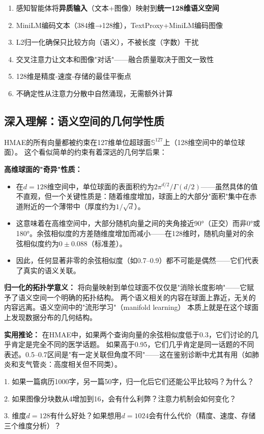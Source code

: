 \documentclass[11pt,a4paper]{ctexart}
\begin{document}
\begin{enumerate}[nosep]
\item 感知智能体将\textbf{异质输入}（文本+图像）映射到\textbf{统一128维语义空间}
\item MiniLM编码文本（384维→128维），TextProxy+MiniLM编码图像
\item L2归一化确保只比较方向（语义），不被长度（字数）干扰
\item 交叉注意力让文本和图像"对话"——融合质量取决于图文一致性
\item 128维是精度-速度-存储的最佳平衡点
\item 不确定性从注意力分散中自然涌现，无需额外计算
\end{enumerate}



\subsection{深入理解：语义空间的几何学性质}

HMAE的所有向量都被约束在127维单位超球面$\mathbb{S}^{127}$上（128维空间中的单位球面）。
这个看似简单的约束有着深远的几何学后果：

\textbf{高维球面的"奇异"性质：}
\begin{itemize}[nosep]
\item 在$d=128$维空间中，单位球面的表面积约为$2\pi^{d/2}/\Gamma(d/2)$——虽然具体的值不直观，但一个关键性质是：随着维度增加，球面上的大部分"面积"集中在赤道附近的一个薄带中（厚度约为$1/\sqrt{d}$）。
\item 这意味着在高维空间中，大部分随机向量之间的夹角接近90°（正交）而非0°或180°。余弦相似度的方差随维度增加而减小——在128维时，随机向量对的余弦相似度约为$0 \pm 0.088$（标准差）。
\item 因此，任何显著非零的余弦相似度（如0.7--0.9）都不可能是偶然——它们代表了真实的语义关联。
\end{itemize}

\textbf{归一化的拓扑学意义：}
将向量映射到单位球面不仅仅是"消除长度影响"——它赋予了语义空间一个明确的拓扑结构。
两个语义相关的内容在球面上靠近，无关的内容远离。语义空间中的"流形学习"（manifold learning）
本质上就是在这个球面上发现数据分布的几何结构。

\textbf{实用推论：} 在HMAE中，如果两个查询向量的余弦相似度低于0.3，它们讨论的几乎肯定是完全不同的医学话题。
如果高于0.95，它们几乎肯定是同一话题的不同表述。0.5--0.7区间是"有一定关联但角度不同"——这在鉴别诊断中尤其有用（如肺炎和支气管炎：高度相关但不同类）。


\begin{exerbox}[思考题 1--3]
1. 如果一篇病历1000字，另一篇50字，归一化后它们还能公平比较吗？为什么？

2. 如果图像分块数从4增加到16，会有什么利弊？注意力机制会如何变化？

3. 维度$d=128$有什么好处？如果想用$d=1024$会有什么代价（精度、速度、存储三个维度分析）？
\end{exerbox}
\end{document}
